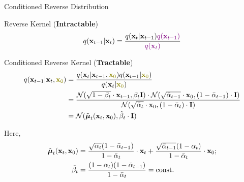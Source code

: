 \documentclass{beamer}
\renewcommand{\eqpause}{}
\renewcommand{\nextonslide}[1]{#1}
\begin{document}
\begin{frame}{Conditioned Reverse Distribution}
    \begin{block}{Reverse Kernel (\textbf{Intractable})}
        \vspace{-0.3cm}
        \[
            q(\mathbf{x}_{t-1}|\mathbf{x}_{t}) = \frac{q(\mathbf{x}_{t}|\mathbf{x}_{t-1}) {\color{violet}q(\mathbf{x}_{t-1})}}{{\color{violet}q(\mathbf{x}_{t})}} 
        \]
        \vspace{-0.5cm}
    \end{block}
    \eqpause
    \begin{block}{Conditioned Reverse Kernel (\textbf{Tractable})}
        \vspace{-0.6cm}
        \begin{align*}
            q(\bx_{t-1}|\bx_{t}, {\color{olive}\bx_0}) & = \frac{q(\bx_{t}|\bx_{t-1}, {\color{olive}\bx_0}) q(\bx_{t-1} | {\color{olive}\bx_0}) }{q(\bx_{t}| {\color{olive}\bx_0})} \\
            \nextonslide{& = \frac{\cN(\sqrt{1 - \beta_t} \cdot \bx_{t-1}, \beta_t \bI) \cdot \cN(\sqrt{\bar{\alpha}_{t-1}} \cdot \bx_0, (1 - \bar{\alpha}_{t-1}) \cdot \bI)}{ \cN(\sqrt{\bar{\alpha}_t} \cdot \bx_0, (1 - \bar{\alpha}_t) \cdot \bI)}} \\
            \nextonslide{&= \cN(\tilde{\bmu}_t(\bx_t, \bx_0), \tilde{\beta}_t \cdot \bI)}
        \end{align*}
        \vspace{-0.7cm}
    \end{block}
    Here,
    \vspace{-0.5cm}
    \begin{align*}
        \tilde{\boldsymbol{\mu}}_t(\mathbf{x}_t, \mathbf{x}_0) &= \frac{\sqrt{\alpha_t}(1 - \bar{\alpha}_{t-1})}{1 - \bar{\alpha}_t} \cdot \mathbf{x}_t + \frac{\sqrt{\bar{\alpha}_{t-1}}(1 - \alpha_t)}{1 - \bar{\alpha}_t} \cdot \mathbf{x}_0; \\
        \tilde{\beta}_t &= \frac{(1 - \alpha_t)(1 - \bar{\alpha}_{t-1})}{1 - \bar{\alpha}_t} = \text{const}.
    \end{align*}
\end{frame}
\end{document}
